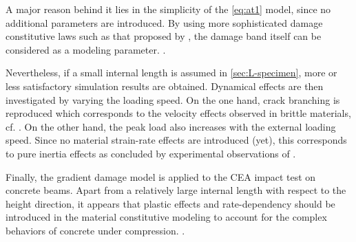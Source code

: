 A major reason behind it lies in the simplicity of the \eqref{eq:at1} model, since no additional parameters are introduced. By using more sophisticated damage constitutive laws such as that proposed by \cite{LorentzGodard:2011}, the damage band itself can be considered as a modeling parameter. .

Nevertheless, if a small internal length is assumed in \cref{sec:L-specimen}, more or less satisfactory simulation results are obtained. Dynamical effects are then investigated by varying the loading speed. On the one hand, crack branching is reproduced which corresponds to the velocity effects observed in brittle materials, cf. \cite{Schardin:2012}. On the other hand, the peak load also increases with the external loading speed. Since no material strain-rate effects are introduced (yet), this corresponds to pure inertia effects as concluded by experimental observations of \cite{OzboltBedeSharmaMayer:2015}.

Finally, the gradient damage model is applied to the CEA impact test on concrete beams. Apart from a relatively large internal length with respect to the height direction, it appears that plastic effects and rate-dependency should be introduced in the material constitutive modeling to account for the complex behaviors of concrete under compression. .
